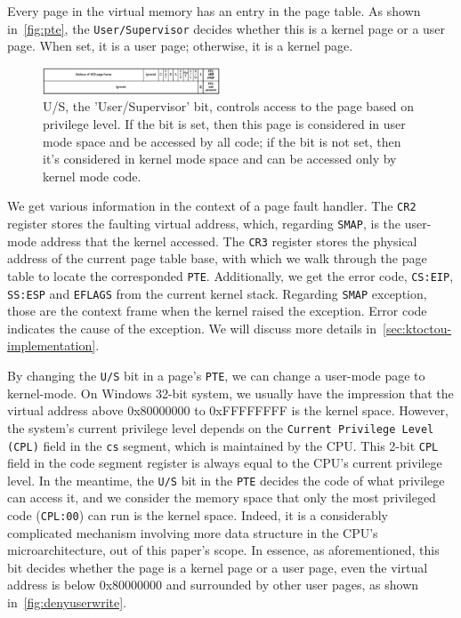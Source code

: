 Every page in the virtual memory has an entry in the page table. As shown in~\autoref{fig:pte}, the \texttt{User/Supervisor} decides whether this is a kernel page or a user page. When set, it is a user page; otherwise, it is a kernel page.

\begin{figure}[th]
  \includegraphics[width=0.47\textwidth]{figures/pte2}
  \centering
  \caption{U/S, the 'User/Supervisor' bit, controls access to the page based on privilege level. If the bit is set, then this page is considered in user mode space and be accessed by all code; if the bit is not set, then it's considered in kernel mode space and can be accessed only by kernel mode code. }
  \label{fig:pte}
\end{figure}



We get various information in the context of a page fault handler. The \texttt{CR2} register stores the faulting virtual address, which, regarding \texttt{SMAP}, is the user-mode address that the kernel accessed. The \texttt{CR3} register stores the physical address of the current page table base, with which we walk through the page table to locate the corresponded \texttt{PTE}. Additionally, we get the error code, \texttt{CS:EIP}, \texttt{SS:ESP} and \texttt{EFLAGS} from the  current kernel stack. Regarding \texttt{SMAP} exception, those are the context frame when the kernel raised the exception. Error code indicates the cause of the exception. We will discuss more details in~\autoref{sec:ktoctou-implementation}.



By changing the \texttt{U/S} bit in a page's \texttt{PTE}, we can change a user-mode page to kernel-mode. On Windows 32-bit system, we usually have the impression that the virtual address above 0x80000000 to 0xFFFFFFFF is the kernel space. However, the system's current privilege level depends on the \texttt{Current Privilege Level (CPL)} field in the \texttt{cs} segment, which is maintained by the CPU. This 2-bit \texttt{CPL} field in the code segment register is always equal to the CPU's current privilege level. In the meantime, the \texttt{U/S} bit in the \texttt{PTE} decides the code of what privilege can access it, and we consider the memory space that only the most privileged code (\texttt{CPL:00}) can run is the kernel space. Indeed, it is a considerably complicated mechanism involving more data structure in the CPU's microarchitecture, out of this paper's scope. In essence, as aforementioned, this bit decides whether the page is a kernel page or a user page, even the virtual address is below 0x80000000 and surrounded by other user pages, as shown in~\autoref{fig:denyuserwrite}.


